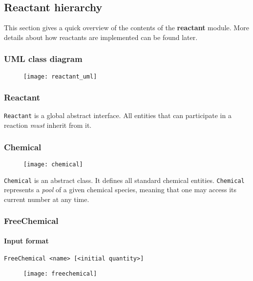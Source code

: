 
\subsection{Reactant hierarchy}

This section gives a quick overview of the contents of the \textbf{reactant} module. More details about how reactants are implemented can be found later.

\subsubsection{UML class diagram}

\begin{figure}[!ht]
	\centering
	\texttt{[image: reactant\_uml]}
\end{figure}

\subsubsection{Reactant}

\texttt{Reactant} is a global abstract interface. All entities that can participate in a reaction \emph{must} inherit from it.

\subsubsection{Chemical}

\begin{figure}[!ht]
	\centering
	\texttt{[image: chemical]}
\end{figure}

\texttt{Chemical} is an abstract class. It defines all standard chemical entities. \texttt{Chemical} represents a \emph{pool} of a given chemical species, meaning that one may access its current number at any time.

\subsubsection{FreeChemical}

\paragraph{Input format}
\begin{verbatim}
FreeChemical <name> [<initial quantity>]
\end{verbatim}

\begin{figure}[!ht]
	\centering
	\texttt{[image: freechemical]}
\end{figure}

